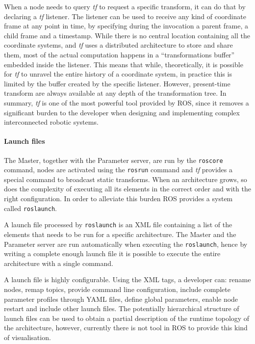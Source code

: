 When a node needs to query \textit{tf} to request a specific transform, it can do that by declaring a \textit{tf} listener. The listener can be used to receive any kind of coordinate frame at any point in time, by specifying during the invocation a parent frame, a child frame and a timestamp. While there is no central location containing all the coordinate systems, and \textit{tf} uses a distributed architecture to store and share them, most of the actual computation happens in a ``transformations buffer'' embedded inside the listener. This means that while, theoretically, it is possible for \textit{tf} to unravel the entire history of a coordinate system, in practice this is limited by the buffer created by the specific listener. However, present-time transform are always available at any depth of the transformation tree. In summary, \textit{tf} is one of the most powerful tool provided by ROS, since it removes a significant burden to the developer when designing and implementing complex interconnected robotic systems.

\paragraph{Launch files} The Master, together with the Parameter server, are run by the \texttt{roscore} command, nodes are activated using the \texttt{rosrun} command and \textit{tf} provides a special command to broadcast static transforms. When an architecture grows, so does the complexity of executing all its elements in the correct order and with the right configuration. In order to alleviate this burden ROS provides a system called \texttt{roslaunch}.

A launch file processed by \texttt{roslaunch} is an XML file containing a list of the elements that needs to be run for a specific architecture. The Master and the Parameter server are run automatically when executing the \texttt{roslaunch}, hence by writing a complete enough launch file it is possible to execute the entire architecture with a single command.

A launch file is highly configurable. Using the XML tags, a developer can: rename nodes, remap topics, provide command line configuration, include complete parameter profiles through YAML files, define global parameters, enable node restart and include other launch files. The potentially hierarchical structure of launch files can be used to obtain a partial description of the runtime topology of the architecture, however, currently there is not tool in ROS to provide this kind of visualisation.

